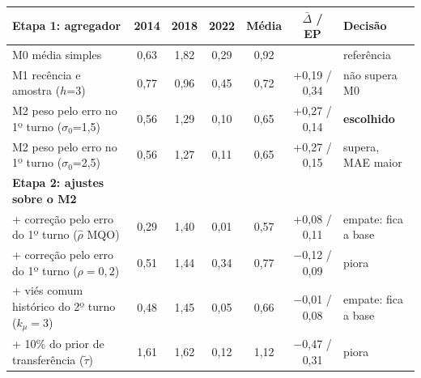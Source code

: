 \begin{tabular}{lcccccl}
\toprule
\textbf{Etapa 1: agregador} & \textbf{2014} & \textbf{2018} & \textbf{2022} & \textbf{Média} & \textbf{$\bar\Delta$ / EP} & \textbf{Decisão} \\
\midrule
M0 média simples & 0,63 & 1,82 & 0,29 & 0,92 &  & referência \\
M1 recência e amostra ($h$=3) & 0,77 & 0,96 & 0,45 & 0,72 & +0,19 / 0,34 & não supera M0 \\
M2 peso pelo erro no 1º turno ($\sigma_0$=1,5) & 0,56 & 1,29 & 0,10 & 0,65 & +0,27 / 0,14 & \textbf{escolhido} \\
M2 peso pelo erro no 1º turno ($\sigma_0$=2,5) & 0,56 & 1,27 & 0,11 & 0,65 & +0,27 / 0,15 & supera, MAE maior \\
\midrule
\textbf{Etapa 2: ajustes sobre o M2} & & & & & & \\
\midrule
+ correção pelo erro do 1º turno ($\hat\rho$ MQO) & 0,29 & 1,40 & 0,01 & 0,57 & +0,08 / 0,11 & empate: fica a base \\
+ correção pelo erro do 1º turno ($\rho=0{,}2$) & 0,51 & 1,44 & 0,34 & 0,77 & $-$0,12 / 0,09 & piora \\
+ viés comum histórico do 2º turno ($k_\mu=3$) & 0,48 & 1,45 & 0,05 & 0,66 & $-$0,01 / 0,08 & empate: fica a base \\
+ 10\% do prior de transferência ($\tilde\tau$) & 1,61 & 1,62 & 0,12 & 1,12 & $-$0,47 / 0,31 & piora \\
\bottomrule
\end{tabular}
